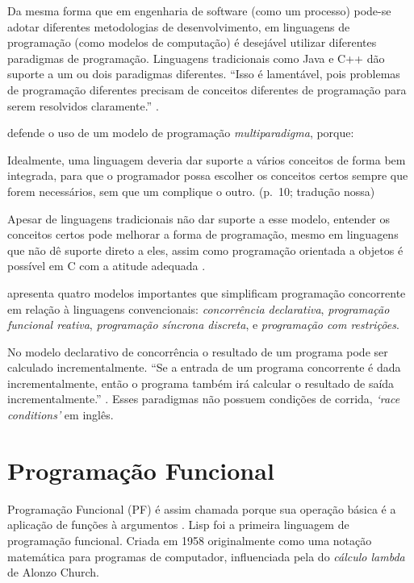 Da mesma forma que em engenharia de software (como um processo) pode-se adotar
diferentes metodologias de desenvolvimento, em linguagens de programação (como
modelos de computação) é desejável utilizar diferentes paradigmas de
programação.
Linguagens tradicionais como Java e C++ dão suporte a um ou dois paradigmas
diferentes.
“Isso é lamentável, pois problemas de programação diferentes precisam de
conceitos diferentes de programação para serem resolvidos claramente.”
\cite[p. 10]{roy2009}.

\textcite{roy2009} defende o uso de um modelo de programação \emph{multiparadigma},
porque:

\begin{citacao}
  Idealmente, uma linguagem deveria dar suporte a vários conceitos de forma
  bem integrada, para que o programador possa escolher os conceitos certos
  sempre que forem necessários, sem que um complique o outro.
  (p.~10; tradução nossa)
\end{citacao}

Apesar de linguagens tradicionais não dar suporte a esse modelo, entender os
conceitos certos pode melhorar a forma de programação, mesmo em linguagens que
não dê suporte direto a eles, assim como programação orientada a objetos é
possível em C com a atitude adequada \cite{roy2009}.

\textcite{roy2009} apresenta quatro modelos importantes que simplificam
programação concorrente em relação à linguagens convencionais: \emph{concorrência
declarativa}, \emph{programação funcional reativa}, \emph{programação síncrona
discreta}, e \emph{programação com restrições}.

No modelo declarativo de concorrência o resultado de um programa pode ser
calculado incrementalmente.
“Se a entrada de um programa concorrente é dada incrementalmente, então o
programa também irá calcular o resultado de saída incrementalmente.”
\cite[p. 238; tradução nossa]{roy2004}.
Esses paradigmas não possuem condições de corrida, \emph{‘race conditions’} em
inglês.


\section{Programação Funcional}
\label{sec:org2524e0f}
Programação Funcional (PF) é assim chamada porque sua operação básica é a
aplicação de funções à argumentos \cite{hughes1990}.
Lisp foi a primeira linguagem de programação funcional.
Criada em 1958 originalmente como uma notação matemática para programas de
computador, influenciada pela do \emph{cálculo lambda} de Alonzo Church.


